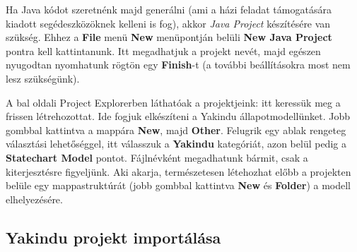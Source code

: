 Ha Java kódot szeretnénk majd generálni (ami a házi feladat támogatására kiadott segédeszközöknek kelleni is fog), akkor \emph{Java Project} készítésére van szükség. Ehhez a \textbf{File} menü \textbf{New} menüpontján belüli \textbf{New Java Project} pontra kell kattintanunk. Itt megadhatjuk a projekt nevét, majd egészen nyugodtan nyomhatunk rögtön egy \textbf{Finish}-t (a további beállításokra most nem lesz szükségünk).

\begin{comment}
a további beállításokra még Szoftlab 3-on sem lesz szükségünk.
\end{comment}

\begin{comment}
\subsection{A projekten belüli Yakindu-mappa létrehozása -->}
\end{comment}

\begin{comment}
A bal oldali Project Explorerben láthatóak a projektjeink: itt keressük meg a frissen létrehozottat. A projekten belül célszerű lesz egy külön mappát létrehozni a modell számára Erre jobb gombbal kattintva \textbf{New} és \textbf{Folder}. A létrehozandó mappának adjuk a \emph{model} nevet. Ez persze bármi lehet, de most a modell nevet adjuk a mappának, hiszen a benne tárolt adat egy Yakinduban létrehozott állapotmodell lesz. A projektünkön belül létrejött egy \codeEsc{model} nevű mappa.
\subsection{A Yakindu állapotmodell létrehozása}
\end{comment}


A bal oldali Project Explorerben láthatóak a projektjeink: itt keressük meg a frissen létrehozottat. Ide fogjuk elkészíteni a Yakindu állapotmodellünket. Jobb gombbal kattintva a mappára \textbf{New}, majd \textbf{Other}. Felugrik egy ablak rengeteg választási lehetőséggel, itt válasszuk a \textbf{Yakindu} kategóriát, azon belül pedig a \textbf{Statechart Model} pontot. Fájlnévként megadhatunk bármit, csak a  kiterjesztésre figyeljünk. Aki akarja, természetesen létehozhat előbb a projekten belüle egy mappastruktúrát (jobb gombbal kattintva \textbf{New} és \textbf{Folder}) a modell elhelyezésére.

\subsection{Yakindu projekt importálása}
\label{sec:yakindu-projekt-importalasa}

